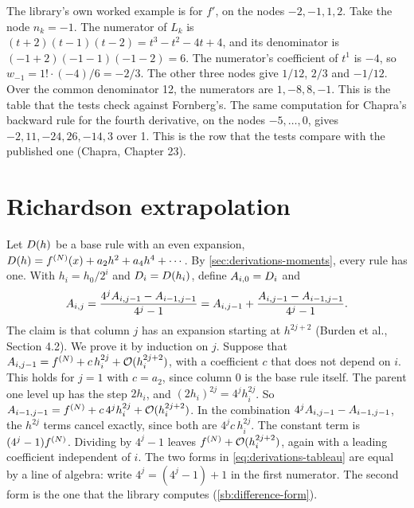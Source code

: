 The library's own worked example is  for $f'$, on the nodes $-2, -1, 1, 2$. Take the node
$n_k = -1$. The numerator of $L_k$ is $(t + 2)(t - 1)(t - 2) = t^3 - t^2 - 4t + 4$, and its denominator is
$(-1 + 2)(-1 - 1)(-1 - 2) = 6$. The numerator's coefficient of $t^1$ is $-4$, so $w_{-1} = 1! \cdot (-4) / 6 = -2/3$.
The other three nodes give $1/12$, $2/3$ and $-1/12$. Over the common denominator 12, the numerators are
$1, -8, 8, -1$. This is the table that the tests check against Fornberg's.\cite{fornberg1988} The same computation
for Chapra's backward rule for the fourth derivative, on the nodes $-5, \ldots, 0$, gives $-2, 11, -24, 26, -14, 3$
over 1. This is the row that the tests compare with the published one (Chapra, Chapter 23).\cite{chapra2015}

\section{Richardson extrapolation}\label{sec:derivations-richardson}

Let $D(h)$ be a base rule with an even expansion, $D(h) = f^{(N)}(x) + a_2 h^2 + a_4 h^4 + \cdots$. By
\cref{sec:derivations-moments}, every  rule has one. With $h_i = h_0 / 2^i$ and $D_i = D(h_i)$,
define $A_{i,0} = D_i$ and
\begin{equation}
  A_{i,j} = \frac{4^j A_{i,j-1} - A_{i-1,j-1}}{4^j - 1}
             = A_{i,j-1} + \frac{A_{i,j-1} - A_{i-1,j-1}}{4^j - 1}.
  \label{eq:derivations-tableau}
\end{equation}
The claim is that column $j$ has an expansion starting at $h^{2j + 2}$ (Burden et al.,\cite{burden2016} Section
4.2). We prove it by induction on $j$. Suppose that $A_{i,j-1} = f^{(N)} + c\, h_i^{2j} +
\mathcal{O}(h_i^{2j+2})$, with a coefficient $c$ that does not depend on $i$. This holds for $j = 1$ with $c = a_2$, since
column 0 is the base rule itself. The parent one level up has the step $2 h_i$, and $(2 h_i)^{2j} = 4^j h_i^{2j}$.
So $A_{i-1,j-1} = f^{(N)} + c\, 4^j h_i^{2j} + \mathcal{O}(h_i^{2j+2})$. In the combination
$4^j A_{i,j-1} - A_{i-1,j-1}$, the $h^{2j}$ terms cancel exactly, since both are $4^j c\, h_i^{2j}$. The
constant term is $(4^j - 1) f^{(N)}$. Dividing by $4^j - 1$ leaves $f^{(N)} + \mathcal{O}(h_i^{2j+2})$, again
with a leading coefficient independent of $i$. The two forms in \cref{eq:derivations-tableau} are equal by a line of
algebra: write $4^j = (4^j - 1) + 1$ in the first numerator. The second form is the one that the library computes
(\cref{sb:difference-form}).

